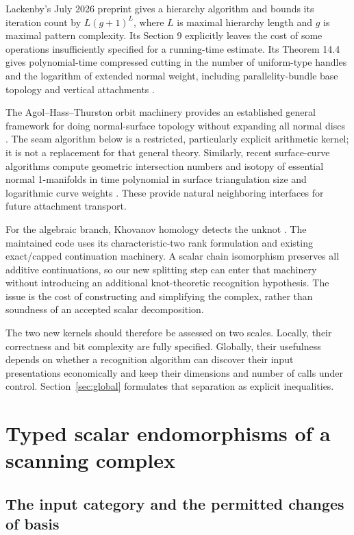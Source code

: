 \documentclass[11pt,a4paper]{article}
\theoremstyle{definition}\newtheorem{definition}[theorem]{Definition}
\theoremstyle{remark}\newtheorem{remark}[theorem]{Remark}
\begin{document}
Lackenby's July 2026 preprint gives a hierarchy algorithm and bounds its
iteration count by $L(g+1)^L$, where $L$ is maximal hierarchy length and $g$
is maximal pattern complexity. Its Section 9 explicitly leaves the cost of
some operations insufficiently specified for a running-time estimate. Its
Theorem 14.4 gives polynomial-time compressed cutting in the number of
uniform-type handles and the logarithm of extended normal weight, including
parallelity-bundle base topology and vertical attachments
\cite[Proposition 9.1 and Theorem 14.4]{lackenby-hierarchy}.

The Agol--Hass--Thurston orbit machinery provides an established general
framework for doing normal-surface topology without expanding all normal
discs \cite{aht}. The seam algorithm below is a restricted, particularly
explicit arithmetic kernel; it is not a replacement for that general theory.
Similarly, recent surface-curve algorithms compute geometric intersection
numbers and isotopy of essential normal 1-manifolds in time polynomial in
surface triangulation size and logarithmic curve weights
\cite[Theorems 1.1--1.2]{lackenby-curves}. These provide natural neighboring
interfaces for future attachment transport.

For the algebraic branch, Khovanov homology detects the unknot
\cite{kronheimer-mrowka}. The maintained code uses its characteristic-two
rank formulation and existing exact/capped continuation machinery. A scalar
chain isomorphism preserves all additive continuations, so our new splitting
step can enter that machinery without introducing an additional knot-theoretic
recognition hypothesis. The issue is the cost of constructing and simplifying
the complex, rather than soundness of an accepted scalar decomposition.

The two new kernels should therefore be assessed on two scales. Locally,
their correctness and bit complexity are fully specified. Globally, their
usefulness depends on whether a recognition algorithm can discover their
input presentations economically and keep their dimensions and number of
calls under control. Section~\ref{sec:global} formulates that separation as
explicit inequalities.

\section{Typed scalar endomorphisms of a scanning complex}
\label{sec:typed}

\subsection{The input category and the permitted changes of basis}
\end{document}

